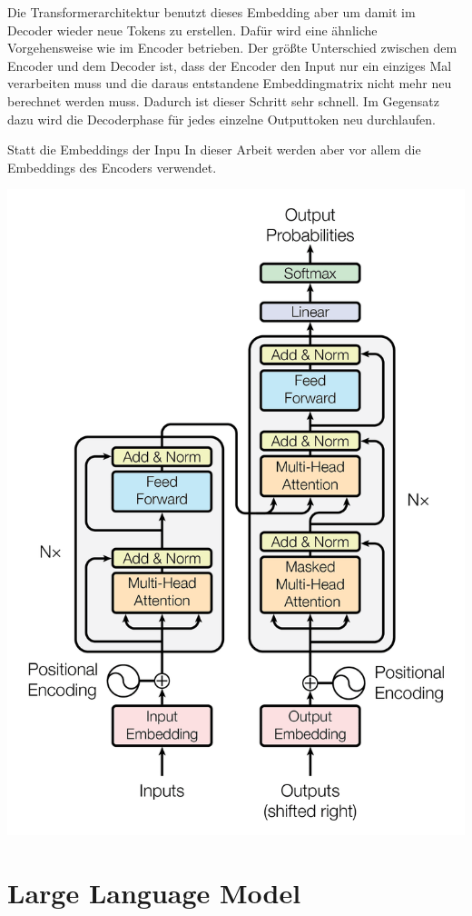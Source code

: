 Die Transformerarchitektur benutzt dieses Embedding aber um damit im Decoder wieder neue Tokens zu erstellen.
Dafür wird eine ähnliche Vorgehensweise wie im Encoder betrieben.
Der größte Unterschied zwischen dem Encoder und dem Decoder ist, dass der Encoder den Input nur ein einziges Mal verarbeiten muss und die daraus entstandene Embeddingmatrix nicht mehr neu berechnet werden muss.
Dadurch ist dieser Schritt sehr schnell.
Im Gegensatz dazu wird die Decoderphase für jedes einzelne Outputtoken neu durchlaufen.

Statt die Embeddings der Inpu
In dieser Arbeit werden aber vor allem die Embeddings des Encoders verwendet.

\cite{vaswani2023}

\includegraphics[width=\linewidth]{figures/transformer_architecture.png}


\section{Large Language Model}

